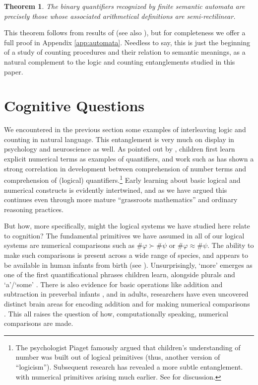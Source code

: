 \documentclass[12pt,oneside,reqno]{amsart}
\newtheorem{theorem}{Theorem}
\theoremstyle{definition}
\begin{document}

\begin{theorem}
The binary quantifiers recognized by finite semantic automata are precisely those whose associated arithmetical definitions are semi-rectilinear.
\end{theorem}
This theorem follows from results of \cite{Kanazawa} (see also \citealt{EHRENFEUCHT1983311}), but for completeness we offer a full proof in Appendix \ref{app:automata}. Needless to say, this is just the beginning of a study of counting procedures and their relation to semantic meanings, as a natural complement to the logic and counting entanglements studied in this paper. 



\section{Cognitive Questions} \label{section:cognition} We encountered in the previous section some examples of interleaving logic and counting in natural language. This entanglement is very much on display in psychology and neuroscience as well. As pointed out by \cite{carey2009origin}, children first learn explicit numerical terms as examples of quantifiers, and work such as \cite{BARNER2009195} has shown a strong correlation in development between comprehension of number terms and comprehension of (logical) quantifiers.\footnote{The psychologist Piaget famously argued that children's understanding of number was built out of logical primitives (thus, another version of ``logicism''). Subsequent research has revealed a more subtle entanglement. with numerical primitives arising much earlier. See \cite{carey2009origin,Dehaene} for discussion.} Early learning about basic logical and numerical constructs is evidently intertwined, and as we have argued this continues even through more mature ``grassroots mathematics'' and ordinary reasoning practices. 

But how, more specifically, might the logical systems we have studied here relate to cognition? The fundamental primitives we have assumed in all of our logical systems are numerical comparisons such as $\#\varphi \succ \#\psi$ or $\#\varphi \approx \#\psi$. The ability to make such comparisons is present across a wide range of species, and appears to be available in human infants from birth (see \citealt{Feigenson,Dehaene}). 
Unsurprisingly, `more' emerges as one of the first quantificational phrases children learn, alongside plurals and `a'/`some' \citep{carey2009origin}. 
There is also evidence for basic operations like addition and subtraction in preverbal infants \citep{Feigenson}, and in adults, researchers have even uncovered distinct brain areas for encoding addition and for making numerical comparisons \citep{Dehaene}.  This all raises the  question of how, computationally speaking, numerical comparisons are made. 
\end{document}
